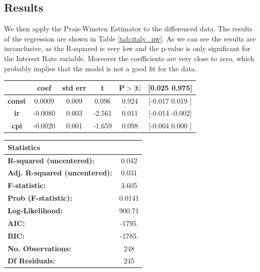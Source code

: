 \subsection*{Results}
We then apply the Prais-Winsten Estimator to the differenced data. The results of the regression are shown in Table \ref{tab:italy_pw}. As we can see the results are inconclusive, as the R-squared is very low and the p-value is only significant for the Interest Rate variable. Moreover the coefficients are very close to zero, which probably implies that the model is not a good fit for the data.

\begin{center}
    {\small
  \begin{tabular}{cccccc}
                             & \textbf{coef} & \textbf{std err} & \textbf{t} & \textbf{P$> |$t$|$} & \textbf{[0.025 0.975]} \\
    \hline    \textbf{const} & 0.0009        & 0.009            & 0.096      & 0.924               & [-0.017 0.019 ]        \\
    \textbf{ir}              & -0.0080       & 0.003            & -2.561     & 0.011               & [-0.014 -0.002]        \\
    \textbf{cpi}             & -0.0020       & 0.001            & -1.659     & 0.098               & [-0.004 0.000 ]        \\
    \hline
  \end{tabular}
  }
  \begin{tabular}{lc}
    Statistics                              &        \\
    \hline
    \textbf{  R-squared (uncentered):}      & 0.042  \\
    \textbf{  Adj. R-squared (uncentered):} & 0.031  \\
    \textbf{  F-statistic:       }          & 3.605  \\
    \textbf{  Prob (F-statistic):}          & 0.0141 \\
    \textbf{  Log-Likelihood:    }          & 900.71 \\
    \textbf{  AIC:               }          & -1795. \\
    \textbf{  BIC:               }          & -1785. \\
    \textbf{No. Observations:}              & 248    \\
    \textbf{Df Residuals:}                  & 245    \\
    \hline
  \end{tabular}
  \label{tab:italy_pw}
\end{center}


